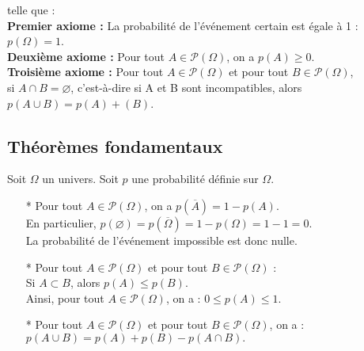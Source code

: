 telle que : \\

\textbf{Premier axiome :} La probabilité de l'événement certain est égale à 1 : $p\left(\Omega\right) = 1$. \\

\textbf{Deuxième axiome : } Pour tout $A \in \mathcal{P}\left (\Omega\right )$, on a $ p\left(A\right) \geqslant 0$. \\

\textbf{Troisième axiome :} Pour tout $A \in \mathcal{P}\left (\Omega\right )$ et pour tout $B \in \mathcal{P}\left (\Omega\right )$,  \\ si $A \cap B = \varnothing$, c'est-à-dire si A et B sont incompatibles, alors $p\left(A\cup B\right) = p \left(A\right) + \left(B \right)$.

\subsection{Théorèmes fondamentaux}

Soit $\Omega$ un univers. Soit $p$ une probabilité définie sur $\Omega$. \\

\begin{itemize}
\item[*] Pour tout $A \in \mathcal{P}\left (\Omega\right )$, on a $p\left(\overline{A}\right) = 1 - p\left(A\right)$. \\ En particulier, $p\left(\varnothing\right) = p\left(\overline{\Omega}\right) = 1 - p\left(\Omega\right) = 1 - 1 = 0$. \\ La probabilité de l'événement impossible est donc nulle. \\

\item[*] Pour tout $A \in \mathcal{P}\left (\Omega\right )$ et pour tout $B\in \mathcal{P}\left (\Omega\right )$ : \\ Si $A \subset B$, alors $p\left(A\right) \leqslant p\left(B\right)$. \\ Ainsi, pour tout $A \in \mathcal{P}\left (\Omega\right )$, on a : $0 \leqslant p\left(A\right) \leqslant 1$. \\

\item[*] Pour tout $A\in \mathcal{P}\left (\Omega\right )$ et pour tout $B \in \mathcal{P}\left (\Omega\right )$, on a : $p\left(A\cup B\right) = p\left(A\right) + p\left(B\right) - p\left(A\cap B\right).$ \\
\end{itemize}

